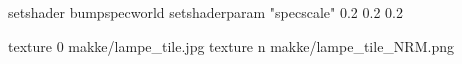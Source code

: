 setshader bumpspecworld
setshaderparam "specscale" 0.2 0.2 0.2

texture 0 makke/lampe_tile.jpg
texture n makke/lampe_tile_NRM.png
